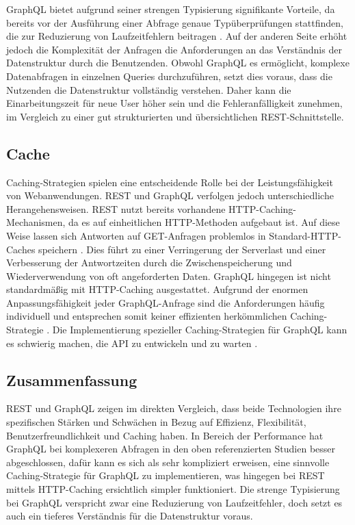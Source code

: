 \documentclass[draft,final]{vutinfth} %
\begin{document}
GraphQL bietet aufgrund seiner strengen Typisierung signifikante Vorteile, da bereits vor der Ausführung einer Abfrage genaue Typüberprüfungen stattfinden, die zur Reduzierung von Laufzeitfehlern beitragen \cite{Brito:2019:MigratingToGraphQL}. 
Auf der anderen Seite erhöht jedoch die Komplexität der Anfragen die Anforderungen an das Verständnis der Datenstruktur durch die Benutzenden. 
Obwohl GraphQL es ermöglicht, komplexe Datenabfragen in einzelnen Queries durchzuführen, setzt dies voraus, dass die Nutzenden die Datenstruktur vollständig verstehen. 
Daher kann die Einarbeitungszeit für neue User höher sein und die Fehleranfälligkeit zunehmen, im Vergleich zu einer gut strukturierten und übersichtlichen REST-Schnittstelle. \cite{Quinamera:2023:GraphMappingStudy}


\subsection{Cache}

Caching-Strategien spielen eine entscheidende Rolle bei der Leistungsfähigkeit von Webanwendungen. 
REST und GraphQL verfolgen jedoch unterschiedliche Herangehensweisen. 
REST nutzt bereits vorhandene HTTP-Caching-Mechanismen, da es auf einheitlichen HTTP-Methoden aufgebaut ist. 
Auf diese Weise lassen sich Antworten auf GET-Anfragen problemlos in Standard-HTTP-Caches speichern \cite{Li:2016:RestCache}. 
Dies führt zu einer Verringerung der Serverlast und einer Verbesserung der Antwortzeiten durch die Zwischenspeicherung und Wiederverwendung von oft angeforderten Daten. 
GraphQL hingegen ist nicht standardmäßig mit HTTP-Caching ausgestattet.
Aufgrund der enormen Anpassungsfähigkeit jeder GraphQL-Anfrage sind die Anforderungen häufig individuell und entsprechen somit keiner effizienten herkömmlichen Caching-Strategie \cite{Brito:2019:MigratingToGraphQL}.
Die Implementierung spezieller Caching-Strategien für GraphQL kann es schwierig machen, die API zu entwickeln und zu warten \cite{Ala:2022:GraphVsRestCaching}.


\subsection{Zusammenfassung}

REST und GraphQL zeigen im direkten Vergleich, dass beide Technologien ihre spezifischen Stärken und Schwächen in Bezug auf Effizienz, Flexibilität, Benutzerfreundlichkeit und Caching haben. 
In Bereich der Performance hat GraphQL bei komplexeren Abfragen in den oben referenzierten Studien besser abgeschlossen, dafür kann es sich als sehr kompliziert erweisen, eine sinnvolle Caching-Strategie für GraphQL zu implementieren, was hingegen bei REST mittels HTTP-Caching ersichtlich simpler funktioniert. 
Die strenge Typisierung bei GraphQL verspricht zwar eine Reduzierung von Laufzeitfehler, doch setzt es auch ein tieferes Verständnis für die Datenstruktur voraus.
\end{document}
